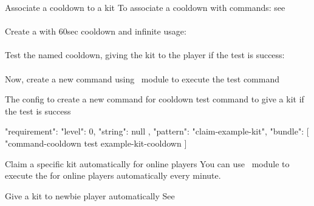 \begin{example}{Associate a cooldown to a kit}
    To associate a cooldown with commands: see~\\\\
    Create a  with 60sec cooldown and infinite usage: \\\\
    Test the named cooldown, giving the kit to the player if the test is success:\\\\

    Now, create a new command using~ module to execute the test command
    \begin{example}{The config to create a new command for cooldown test command to give a kit if the test is success}
        \begin{json}
        {
            "requirement": {
            "level": 0,
            "string": null
        },
            "pattern": "claim-example-kit",
            "bundle": [
            "command-cooldown test example-kit-cooldown %
            ]
        }
        \end{json}
    \end{example}

\end{example}

\begin{example}{Claim a specific kit automatically for online players}
    You can use~ module to execute the  for online players automatically every minute.
\end{example}

\begin{example}{Give a kit to newbie player automatically}
    See~
\end{example}
